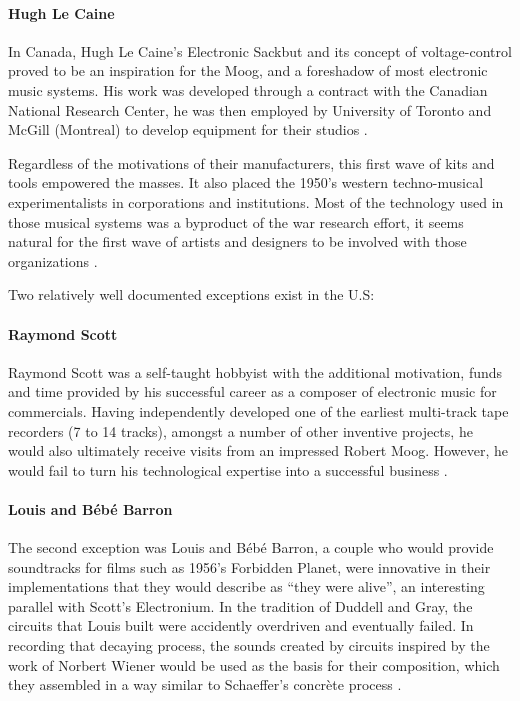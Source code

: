 \paragraph{Hugh Le Caine}

In Canada, Hugh Le Caine’s Electronic Sackbut and its concept of voltage-control proved to be an inspiration for the Moog, and a foreshadow of most electronic music systems. His work was developed through a contract with the Canadian National Research Center, he was then employed by University of Toronto and McGill (Montreal) to develop equipment for their studios \cite{holmes2002}. 

Regardless of the motivations of their manufacturers, this first wave of kits and tools empowered the masses. It also placed the 1950’s western techno-musical experimentalists in corporations and institutions. Most of the technology used in those musical systems was a byproduct of the war research effort, it seems natural for the first wave of artists and designers to be involved with those organizations \cite[p.81]{holmes2002}. 

Two relatively well documented exceptions exist in the U.S:

\paragraph{Raymond Scott}

Raymond Scott was a self-taught hobbyist with the additional motivation, funds and time provided by his successful career as a composer of electronic music for commercials. Having independently developed one of the earliest multi-track tape recorders (7 to 14 tracks), amongst a number of other inventive projects, he would also ultimately receive visits from an impressed Robert Moog. However, he would fail to turn his technological expertise into a successful business \cite{holmes2002}. 

\paragraph{Louis and Bébé Barron}

The second exception was Louis and Bébé Barron, a couple who would provide soundtracks for films such as 1956’s Forbidden Planet, were innovative in their implementations that they would describe as “they were alive”, an interesting parallel with Scott’s Electronium. In the tradition of Duddell and Gray, the circuits that Louis built were accidently overdriven and eventually failed. In recording that decaying process, the sounds created by circuits inspired by the work of Norbert Wiener would be used as the basis for their composition, which they assembled in a way similar to Schaeffer’s concrète process \cite{dunbar2010}. 

